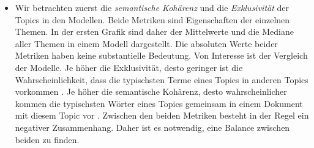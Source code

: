 \documentclass[
]{book}
\providecommand{\tightlist}{%
  \setlength{\itemsep}{0pt}\setlength{\parskip}{0pt}}
\begin{document}
\begin{itemize}
\tightlist
\item
  Wir betrachten zuerst die \emph{semantische Kohärenz} und die \emph{Exklusivität} der Topics in den Modellen. Beide Metriken sind Eigenschaften der einzelnen Themen. In der ersten Grafik sind daher der Mittelwerte und die Mediane aller Themen in einem Modell dargestellt. Die absoluten Werte beider Metriken haben keine substantielle Bedeutung. Von Interesse ist der Vergleich der Modelle. Je höher die Exklusivität, desto geringer ist die Wahrscheinlichkeit, dass die typischsten Terme eines Topics in anderen Topics vorkommen \citep{robertsStructuralTopicModels2014}. Je höher die semantische Kohärenz, desto wahrscheinlicher kommen die typischsten Wörter eines Topics gemeinsam in einem Dokument mit diesem Topic vor \citep{davidmimnoOptimizingSemanticCoherence2011}. Zwischen den beiden Metriken besteht in der Regel ein negativer Zusammenhang. Daher ist es notwendig, eine Balance zwischen beiden zu finden.


\end{itemize}
\end{document}
